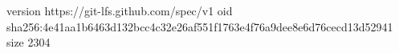version https://git-lfs.github.com/spec/v1
oid sha256:4e41aa1b6463d132bcc4c32e26af551f1763e4f76a9dee8e6d76cecd13d52941
size 2304
